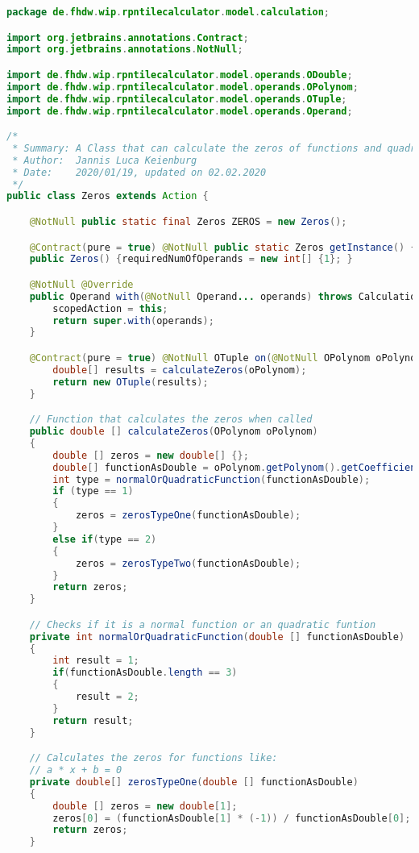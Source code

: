 \begin{lstlisting}[caption=Zeros (Keienburg),label=list:Zeros,language=Java]
package de.fhdw.wip.rpntilecalculator.model.calculation;

import org.jetbrains.annotations.Contract;
import org.jetbrains.annotations.NotNull;

import de.fhdw.wip.rpntilecalculator.model.operands.ODouble;
import de.fhdw.wip.rpntilecalculator.model.operands.OPolynom;
import de.fhdw.wip.rpntilecalculator.model.operands.OTuple;
import de.fhdw.wip.rpntilecalculator.model.operands.Operand;

/*
 * Summary: A Class that can calculate the zeros of functions and quadratic functions.
 * Author:  Jannis Luca Keienburg
 * Date:    2020/01/19, updated on 02.02.2020
 */
public class Zeros extends Action {

    @NotNull public static final Zeros ZEROS = new Zeros();

    @Contract(pure = true) @NotNull public static Zeros getInstance() { return ZEROS; }
    public Zeros() {requiredNumOfOperands = new int[] {1}; }

    @NotNull @Override
    public Operand with(@NotNull Operand... operands) throws CalculationException {
        scopedAction = this;
        return super.with(operands);
    }

    @Contract(pure = true) @NotNull OTuple on(@NotNull OPolynom oPolynom) {
        double[] results = calculateZeros(oPolynom);
        return new OTuple(results);
    }

    // Function that calculates the zeros when called
    public double [] calculateZeros(OPolynom oPolynom)
    {
        double [] zeros = new double[] {};
        double[] functionAsDouble = oPolynom.getPolynom().getCoefficients();
        int type = normalOrQuadraticFunction(functionAsDouble);
        if (type == 1)
        {
            zeros = zerosTypeOne(functionAsDouble);
        }
        else if(type == 2)
        {
            zeros = zerosTypeTwo(functionAsDouble);
        }
        return zeros;
    }

    // Checks if it is a normal function or an quadratic funtion
    private int normalOrQuadraticFunction(double [] functionAsDouble)
    {
        int result = 1;
        if(functionAsDouble.length == 3)
        {
            result = 2;
        }
        return result;
    }

    // Calculates the zeros for functions like:
    // a * x + b = 0
    private double[] zerosTypeOne(double [] functionAsDouble)
    {
        double [] zeros = new double[1];
        zeros[0] = (functionAsDouble[1] * (-1)) / functionAsDouble[0];
        return zeros;
    }


\end{lstlisting}
